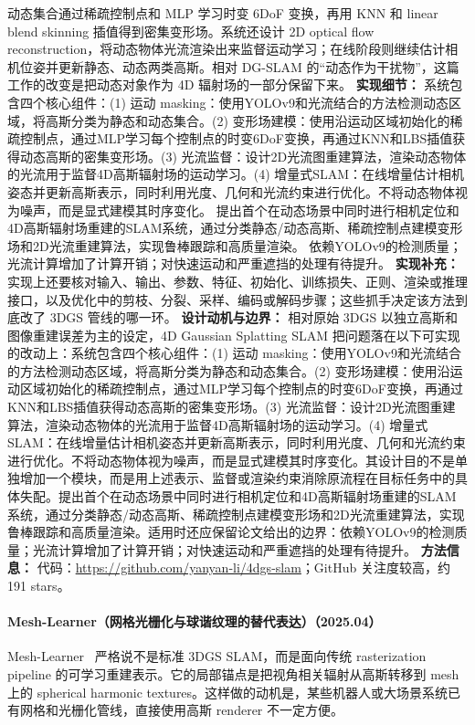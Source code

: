 动态集合通过稀疏控制点和 MLP 学习时变 6DoF 变换，再用 KNN 和 linear blend skinning 插值得到密集变形场。系统还设计 2D optical flow reconstruction，将动态物体光流渲染出来监督运动学习；在线阶段则继续估计相机位姿并更新静态、动态两类高斯。相对 DG-SLAM 的“动态作为干扰物”，这篇工作的改变是把动态对象作为 4D 辐射场的一部分保留下来。
\textbf{实现细节：} 系统包含四个核心组件：(1) 运动 masking：使用YOLOv9和光流结合的方法检测动态区域，将高斯分类为静态和动态集合。(2) 变形场建模：使用沿运动区域初始化的稀疏控制点，通过MLP学习每个控制点的时变6DoF变换，再通过KNN和LBS插值获得动态高斯的密集变形场。(3) 光流监督：设计2D光流图重建算法，渲染动态物体的光流用于监督4D高斯辐射场的运动学习。(4) 增量式SLAM：在线增量估计相机姿态并更新高斯表示，同时利用光度、几何和光流约束进行优化。不将动态物体视为噪声，而是显式建模其时序变化。 提出首个在动态场景中同时进行相机定位和4D高斯辐射场重建的SLAM系统，通过分类静态/动态高斯、稀疏控制点建模变形场和2D光流重建算法，实现鲁棒跟踪和高质量渲染。 依赖YOLOv9的检测质量；光流计算增加了计算开销；对快速运动和严重遮挡的处理有待提升。
\textbf{实现补充：} 实现上还要核对输入、输出、参数、特征、初始化、训练损失、正则、渲染或推理接口，以及优化中的剪枝、分裂、采样、编码或解码步骤；这些抓手决定该方法到底改了 3DGS 管线的哪一环。
\textbf{设计动机与边界：} 相对原始 3DGS 以独立高斯和图像重建误差为主的设定，4D Gaussian Splatting SLAM 把问题落在以下可实现的改动上：系统包含四个核心组件：(1) 运动 masking：使用YOLOv9和光流结合的方法检测动态区域，将高斯分类为静态和动态集合。(2) 变形场建模：使用沿运动区域初始化的稀疏控制点，通过MLP学习每个控制点的时变6DoF变换，再通过KNN和LBS插值获得动态高斯的密集变形场。(3) 光流监督：设计2D光流图重建算法，渲染动态物体的光流用于监督4D高斯辐射场的运动学习。(4) 增量式SLAM：在线增量估计相机姿态并更新高斯表示，同时利用光度、几何和光流约束进行优化。不将动态物体视为噪声，而是显式建模其时序变化。其设计目的不是单独增加一个模块，而是用上述表示、监督或渲染约束消除原流程在目标任务中的具体失配。提出首个在动态场景中同时进行相机定位和4D高斯辐射场重建的SLAM系统，通过分类静态/动态高斯、稀疏控制点建模变形场和2D光流重建算法，实现鲁棒跟踪和高质量渲染。适用时还应保留论文给出的边界：依赖YOLOv9的检测质量；光流计算增加了计算开销；对快速运动和严重遮挡的处理有待提升。
\textbf{方法信息：} 代码：\url{https://github.com/yanyan-li/4dgs-slam}；GitHub 关注度较高，约 191 stars。



\paragraph{Mesh-Learner（网格光栅化与球谐纹理的替代表达）（2025.04）}
Mesh-Learner~\cite{2504_19938} 严格说不是标准 3DGS SLAM，而是面向传统 rasterization pipeline 的可学习重建表示。它的局部锚点是把视角相关辐射从高斯转移到 mesh 上的 spherical harmonic textures。这样做的动机是，某些机器人或大场景系统已有网格和光栅化管线，直接使用高斯 renderer 不一定方便。

